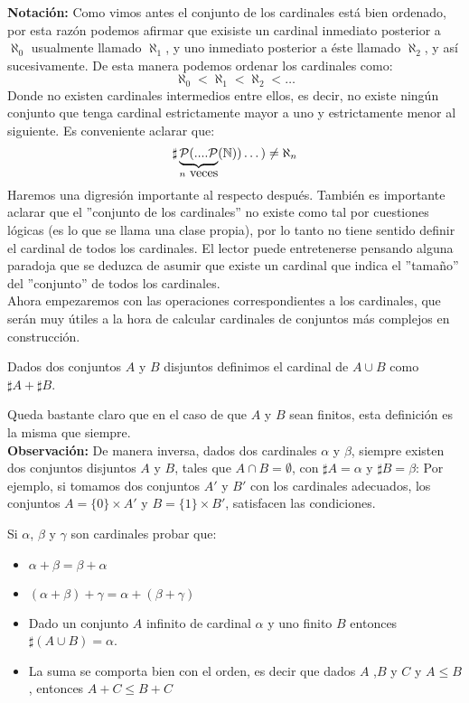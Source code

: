 \documentclass[12pt,a4paper]{book}
\begin{document}
\textbf{Notación:} Como vimos antes el conjunto de los cardinales está bien ordenado, por esta razón podemos afirmar que exisiste un cardinal inmediato posterior a $\aleph_0$ usualmente llamado $\aleph_1$, y uno inmediato posterior a éste llamado $\aleph_2$, y así sucesivamente. De esta manera podemos ordenar los cardinales como:
$$ \aleph_0 < \aleph_1 < \aleph_2 < \ldots$$
Donde no existen cardinales intermedios entre ellos, es decir, no existe ningún conjunto que tenga cardinal estrictamente mayor a uno y estrictamente menor al siguiente. Es conveniente aclarar que: 
$$\sharp \displaystyle \underbrace{\mathcal{P}(....\mathcal{P}}_{n \mbox{ veces}}(\mathbb{N})) \dots ) \neq \aleph_n$$
Haremos una digresión importante al respecto después. También es importante aclarar que el ''conjunto de los cardinales'' no existe como tal por cuestiones lógicas (es lo que se llama una clase propia), por lo tanto no tiene sentido definir el cardinal de todos los cardinales. El lector puede entretenerse pensando alguna paradoja que se deduzca de asumir que existe un cardinal que indica el ''tamaño'' del ''conjunto'' de todos los cardinales.\\[0.5cm]
Ahora empezaremos con las operaciones correspondientes a los cardinales, que serán muy útiles a la hora de calcular cardinales de conjuntos más complejos en construcción.
\begin{defi}
Dados dos conjuntos $A$ y $B$ disjuntos definimos el cardinal de $A \cup B$ como $\sharp A + \sharp B$. 
\end{defi}
Queda bastante claro que en el caso de que $A$ y $B$ sean finitos, esta definición es la misma que siempre.\\[0.5cm]
\textbf{Observación:} De manera inversa, dados dos cardinales $\alpha$ y $\beta$, siempre existen dos conjuntos disjuntos $A$ y $B$, tales que $A \cap B = \emptyset$, con $\sharp A = \alpha$ y $\sharp B=\beta$: Por ejemplo, si tomamos dos conjuntos $A'$ y $B'$ con los cardinales adecuados, los conjuntos $A =\{0\} \times A'$ y $B=\{1\} \times B'$, satisfacen las condiciones.
\begin{ej}
Si $\alpha$, $\beta$ y $\gamma$ son cardinales probar que:
\begin{itemize}
\item $\alpha + \beta = \beta + \alpha$
\item $(\alpha + \beta) + \gamma = \alpha + (\beta + \gamma)$
\item Dado un conjunto $A$ infinito de cardinal $\alpha$ y uno finito $B$ entonces $\sharp (A \cup B) = \alpha$.
\item La suma se comporta bien con el orden, es decir que dados $A$ ,$B$ y $C$ y $ A \leq B$, entonces $A + C \leq B +C$
\end{itemize}
\end{ej}
\end{document}
